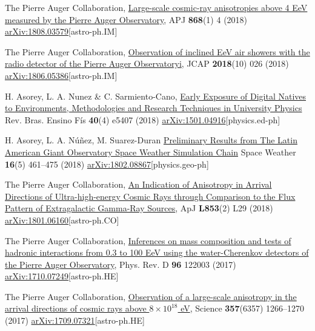 \begin{etaremune}
\item {}The Pierre Auger Collaboration, \href{https://doi.org/10.3847/1538-4357/aae689}{{Large-scale cosmic-ray anisotropies above 4 EeV measured by the Pierre Auger Observatory}}, APJ {\bf{868}}(1) 4 (2018) \href{https://arxiv.org/abs/1808.03579}{arXiv:1808.03579}[astro-ph.IM]

\item {}The Pierre Auger Collaboration, \href{https://doi.org/10.1088/1475-7516/2018/10/026}{{Observation of inclined EeV air showers with the radio detector of the Pierre Auger Observatoryi}}, JCAP {\bf{2018}}(10) 026 (2018) \href{https://arxiv.org/abs/1806.05386}{arXiv:1806.05386}[astro-ph.IM]


\item {} H. Asorey, L. A. Nunez \& C. Sarmiento-Cano, \href{http://dx.doi.org/10.1590/1806-9126-rbef-2018-0092}{{Early Exposure of Digital Natives to Environments, Methodologies and Research Techniques in University Physics}} Rev. Bras. Ensino Fís {\bf{40}}(4) e5407 (2018) \href{http://arxiv.org/abs/1501.04916}{arXiv:1501.04916}[physics.ed-ph]

\item {}H. Asorey, L. A. Núñez, M. Suarez-Duran \href{https://doi.org/10.1002/2017SW001774}{{Preliminary Results from The Latin American Giant Observatory Space Weather Simulation Chain}} Space Weather {\bf{16}}(5) 461--475 (2018) \href{https://arxiv.org/abs/1802.08867}{arXiv:1802.08867}[physics.geo-ph]

\item {}The Pierre Auger Collaboration, \href{https://doi.org/10.3847/2041-8213/aaa66d}{{An Indication of Anisotropy in Arrival Directions of Ultra-high-energy Cosmic Rays through Comparison to the Flux Pattern of Extragalactic Gamma-Ray Sources}}, ApJ {\bf{L853}}(2) L29 (2018) \href{https://arxiv.org/abs/1801.06160}{arXiv:1801.06160}[astro-ph.CO]
	
\item {}The Pierre Auger Collaboration, \href{https://doi.org/10.1103/PhysRevD.96.122003}{{Inferences on mass composition and tests of hadronic interactions from 0.3 to 100 EeV using the water-Cherenkov detectors of the Pierre Auger Observatory}}, Phys. Rev. D {\bf{96}} 122003 (2017) \href{https://arxiv.org/abs/1710.07249}{arXiv:1710.07249}[astro-ph.HE]

\item {}The Pierre Auger Collaboration, \href{https://doi.org/10.1126/science.aan4338}{{Observation of a large-scale anisotropy in the arrival directions of cosmic rays above $8\times 10^{18}$ eV}}, Science {\bf{357}}(6357) 1266--1270 (2017) \href{https://arxiv.org/abs/1709.07321}{arXiv:1709.07321}[astro-ph.HE]


\end{etaremune}
